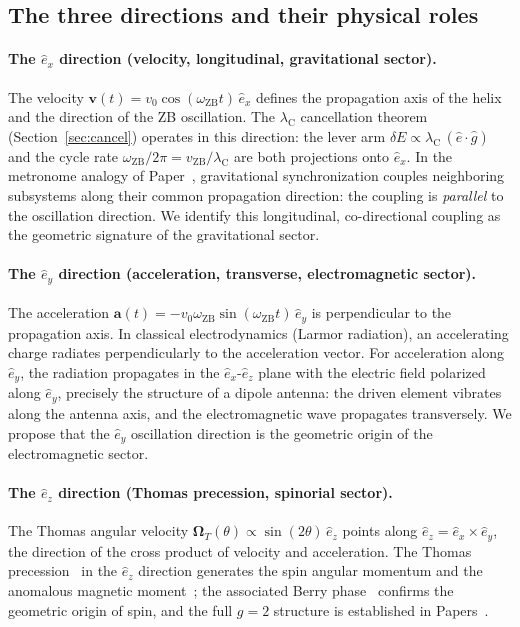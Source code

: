 \documentclass[%
 reprint, amsmath,amssymb, aps, prb, ]{revtex4-2}
\numberwithin{equation}{section}
\newcommand{\iphase}{\theta}
\newcommand{\omZB}{\omega_{\text{ZB}}}
\newcommand{\lambdaC}{\lambda_{\mathrm{C}}}
\newcommand{\vZB}{v_{\mathrm{ZB}}}
\newcommand{\OmT}{\boldsymbol{\Omega}_T}
\newcommand{\ehat}[1]{\hat{e}_{#1}}
\begin{document}
\subsection{The three directions and their physical roles}

\paragraph{The $\ehat{x}$ direction (velocity, longitudinal, gravitational sector).}
The velocity $\mathbf{v}(t) = v_0\cos(\omZB t)\,\ehat{x}$ defines the propagation axis of the helix and the direction of the ZB oscillation. The $\lambdaC$ cancellation theorem (Section~\ref{sec:cancel}) operates in this direction: the lever arm $\delta E \propto \lambdaC\,(\hat{e}\cdot\hat{g})$ and the cycle rate $\omZB/2\pi = \vZB/\lambdaC$ are both projections onto $\ehat{x}$. In the metronome analogy of Paper~\cite{hanamura34}, gravitational synchronization couples neighboring subsystems along their common propagation direction: the coupling is \emph{parallel} to the oscillation direction. We identify this longitudinal, co-directional coupling as the geometric signature of the gravitational sector.

\paragraph{The $\ehat{y}$ direction (acceleration, transverse, electromagnetic sector).}
The acceleration $\mathbf{a}(t) = -v_0\omZB\sin(\omZB t)\,\ehat{y}$ is perpendicular to the propagation axis. In classical electrodynamics (Larmor radiation), an accelerating charge radiates perpendicularly to the acceleration vector. For acceleration along $\ehat{y}$, the radiation propagates in the $\ehat{x}$-$\ehat{z}$ plane with the electric field polarized along $\ehat{y}$, precisely the structure of a dipole antenna: the driven element vibrates along the antenna axis, and the electromagnetic wave propagates transversely. We propose that the $\ehat{y}$ oscillation direction is the geometric origin of the electromagnetic sector.

\paragraph{The $\ehat{z}$ direction (Thomas precession, spinorial sector).}
The Thomas angular velocity $\OmT(\iphase) \propto \sin(2\iphase)\,\ehat{z}$ points along $\ehat{z} = \ehat{x}\times\ehat{y}$, the direction of the cross product of velocity and acceleration. The Thomas precession~\cite{thomas1926} in the $\ehat{z}$ direction generates the spin angular momentum and the anomalous magnetic moment~\cite{hanamura19,hanamura47}; the associated Berry phase~\cite{hanamura26,berry1984} confirms the geometric origin of spin, and the full $g=2$ structure is established in Papers~\cite{hanamura38,hanamura48}.
\end{document}
